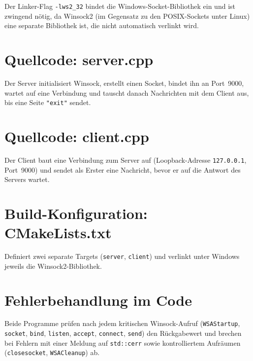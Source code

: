 \documentclass[a4paper,11pt]{article}
\begin{document}
Der Linker-Flag \texttt{-lws2\_32} bindet die Windows-Socket-Bibliothek ein
und ist zwingend nötig, da Winsock2 (im Gegensatz zu den POSIX-Sockets unter
Linux) eine separate Bibliothek ist, die nicht automatisch verlinkt wird.

\section{Quellcode: server.cpp}

Der Server initialisiert Winsock, erstellt einen Socket, bindet ihn an
Port~9000, wartet auf eine Verbindung und tauscht danach Nachrichten mit
dem Client aus, bis eine Seite \texttt{"exit"} sendet.



\section{Quellcode: client.cpp}

Der Client baut eine Verbindung zum Server auf (Loopback-Adresse
\texttt{127.0.0.1}, Port~9000) und sendet als Erster eine Nachricht, bevor
er auf die Antwort des Servers wartet.



\section{Build-Konfiguration: CMakeLists.txt}

Definiert zwei separate Targets (\texttt{server}, \texttt{client}) und
verlinkt unter Windows jeweils die Winsock2-Bibliothek.



\section{Fehlerbehandlung im Code}

Beide Programme prüfen nach jedem kritischen Winsock-Aufruf
(\texttt{WSAStartup}, \texttt{socket}, \texttt{bind}, \texttt{listen},
\texttt{accept}, \texttt{connect}, \texttt{send}) den Rückgabewert und
brechen bei Fehlern mit einer Meldung auf \texttt{std::cerr} sowie
kontrolliertem Aufräumen (\texttt{closesocket}, \texttt{WSACleanup}) ab.
\end{document}
